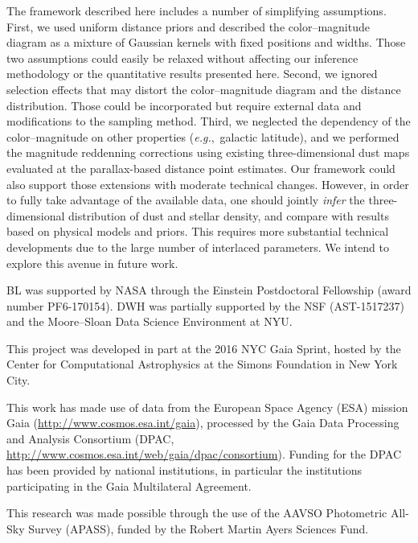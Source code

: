 \documentclass[manuscript, letterpaper]{aastex6}
\newcommand{\eg}{{\textit{e.g.},~}}
\begin{document}
The framework described here includes a number of simplifying assumptions. 
First, we used uniform distance priors and described the color--magnitude diagram as a mixture of Gaussian kernels with fixed positions and widths.
Those two assumptions could easily be relaxed without affecting our inference methodology or the quantitative results presented here.
Second, we ignored selection effects that may distort the color--magnitude diagram and the distance distribution.
Those could be incorporated but require external data and modifications to the sampling method.
Third, we neglected the dependency of the color--magnitude on other properties (\eg galactic latitude), and we performed the magnitude reddenning corrections using existing three-dimensional dust maps evaluated at the parallax-based distance point estimates.
Our framework could also support those extensions with moderate technical changes.
However, in order to fully take advantage of the available data, one should jointly \textit{infer} the three-dimensional distribution of dust and stellar density, and compare with results based on physical models and priors.
This requires more substantial technical developments due to the large number of interlaced parameters.
We intend to explore this avenue in future work.


\acknowledgments

BL was supported by NASA through the Einstein Postdoctoral Fellowship (award number PF6-170154).
DWH was partially supported by the NSF (AST-1517237) and the Moore--Sloan Data Science Environment at NYU.

This project was developed in part at the 2016 NYC Gaia Sprint, hosted by the Center for Computational Astrophysics at the Simons Foundation in New York City.

This work has made use of data from the European Space Agency (ESA) mission Gaia (\url{http://www.cosmos.esa.int/gaia}), processed by the Gaia Data Processing and Analysis Consortium (DPAC, \url{http://www.cosmos.esa.int/web/gaia/dpac/consortium}). Funding for the DPAC has been provided by national institutions, in particular the institutions participating in the Gaia Multilateral Agreement.

This research was made possible through the use of the AAVSO Photometric All-Sky Survey (APASS), funded by the Robert Martin Ayers Sciences Fund.







\end{document}
